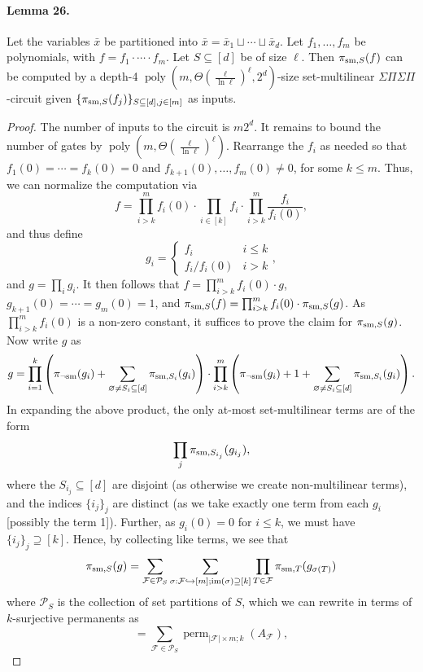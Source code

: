 \documentclass[10pt,a4paper]{article}
\begin{document}
\paragraph{Lemma 26.} Let the variables $\bar x$ be partitioned into $\bar x=\bar x_1\sqcup\cdots\sqcup\bar x_d$. Let $f_1,\ldots,f_m$ be polynomials, with $f=f_1\cdot\cdots\cdot f_m$. Let $S\subseteq[d]$ be of size $\ell$. Then $\pi_{{\rm sm},S}(f)$ can be computed by a depth-4 $\operatorname{poly}(m,\Theta(\frac\ell{\ln\ell})^\ell,2^d)$-size set-multilinear $\Sigma\Pi\Sigma\Pi$-circuit given $\{\pi_{{\rm sm},S}(f_j)\}_{S\subseteq[d],j\in[m]}$ as inputs.
\begin{proof}
The number of inputs to the circuit is $m2^d$. It remains to bound the number of gates by $\operatorname{poly}(m,\Theta(\frac\ell{\ln\ell})^\ell)$.
Rearrange the $f_i$ as needed so that $f_1(0)=\cdots=f_k(0)=0$ and $f_{k+1}(0),\ldots,f_m(0)\ne0$, for some $k\le m$. Thus, we can normalize the computation via
\[f=\prod_{i>k}^m f_i(0)\cdot\prod_{i\in[k]}f_i\cdot\prod_{i>k}^m\frac{f_i}{f_i(0)},\]
and thus define
\[g_i=\begin{cases}f_i&i\le k\\f_i/f_i(0)&i>k\end{cases},\]
and $g=\prod_i g_i$. It then follows that $f=\prod_{i>k}^m f_i(0)\cdot g$, $g_{k+1}(0)=\cdots=g_m(0)=1$, and $\pi_{{\rm sm},S}(f)=\prod_{i>k}^m f_i(0)\cdot\pi_{{\rm sm},S}(g)$. As $\prod_{i>k}^m f_i(0)$ is a non-zero constant, it suffices to prove the claim for $\pi_{{\rm sm},S}(g)$.
Now write $g$ as
\[g=\prod_{i=1}^k\left(\pi_{\neg{\rm sm}}(g_i)+\sum_{\varnothing\ne S_i\subseteq[d]}\pi_{{\rm sm},S_i}(g_i)\right)\cdot\prod_{i>k}^m\left(\pi_{\neg{\rm sm}}(g_i)+1+\sum_{\varnothing\ne S_i\subseteq[d]}\pi_{{\rm sm},S_i}(g_i)\right).\]
In expanding the above product, the only at-most set-multilinear terms are of the form
\[\prod_j\pi_{{\rm sm},S_{i_j}}(g_{i_j}),\]
where the $S_{i_j}\subseteq[d]$ are disjoint (as otherwise we create non-multilinear terms), and the indices $\{i_j\}_j$ are distinct (as we take exactly one term from each $g_i$ [possibly the term 1]).
Further, as $g_i(0)=0$ for $i\le k$, we must have $\{i_j\}_j\supseteq[k]$. Hence, by collecting like terms, we see that
\[\pi_{{\rm sm},S}(g)=\sum_{\mathcal F\in\mathcal P_S}\sum_{\sigma:\mathcal F\hookrightarrow[m];\operatorname{im}(\sigma)\supseteq[k]}\prod_{T\in\mathcal F}\pi_{{\rm sm},T}(g_{\sigma(T)})\]
where $\mathcal P_S$ is the collection of set partitions of $S$, which we can rewrite in terms of $k$-surjective permanents as
\[=\sum_{\mathcal F\in\mathcal P_S}\operatorname{perm}_{|\mathcal F|\times m;k}(A_{\mathcal F}),\]

\end{proof}
\end{document}
